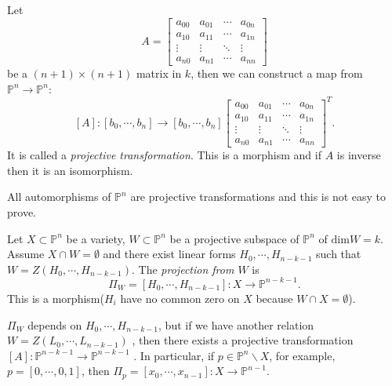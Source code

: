 \begin{definition}
	Let \begin{equation}
		A=\left[\begin{matrix}
				a_{00} & a_{01} & \cdots & a_{0n} \\
				a_{10} & a_{11} & \cdots & a_{1n} \\
				\vdots & \vdots & \ddots & \vdots \\
				a_{n0} & a_{n1} & \cdots & a_{nn}
			\end{matrix}\right]
	\end{equation}
	be a $ (n+1)\times (n+1) $ matrix  in $ k $, then we can construct a map from $ \mathbb{P}^n  \to  \mathbb{P}^n $:
	$$
		[A]:	[b_0,\cdots,b_n]\to [b_0,\cdots,b_n]\left[\begin{matrix}
				a_{00} & a_{01} & \cdots & a_{0n} \\
				a_{10} & a_{11} & \cdots & a_{1n} \\
				\vdots & \vdots & \ddots & \vdots \\
				a_{n0} & a_{n1} & \cdots & a_{nn}
			\end{matrix}\right]^{T}.
	$$
	It is called a \textit{projective transformation}. This is a morphism and if $ A $ is inverse then it is an isomorphism.
\end{definition}
\begin{remark}
	All automorphisms of $ \mathbb{P}^n $  are projective transformations and this is not easy to prove.
\end{remark}
\begin{definition}[Projection]
	Let $ X\subset\mathbb{P}^n  $ be a variety, $ W\subset \mathbb{P}^n $ be a projective subspace of $ \mathbb{P}^n $ of $ \mathrm{dim}W=k $. Assume $ X\cap W= \emptyset $ and there exist linear forms $ H_0,\cdots,H_{n-k-1} $ such that $ W=Z(H_0,\cdots,H_{n-k-1}) $. The \textit{projection from $ W $} is
	$$
		\Pi_W=[H_0,\cdots,H_{n-k-1}]:X\to \mathbb{P}^{n-k-1}.
	$$
	This is a morphism($ H_i $ have no common zero on $ X $ because $ W\cap X=\emptyset $).
\end{definition}
\begin{remark}
	$ \Pi_W $ depends on $ H_0,\cdots,H_{n-k-1} $, but if we have another relation $ W=Z(L_0,\cdots,L_{n-k-1}) $ , then there exists a projective transformation $ [A]:\mathbb{P}^{n-k-1}\to \mathbb{P}^{n-k-1} $ . In particular, if $ p\in \mathbb{P}^n\backslash X $, for example, $ p=[0,\cdots,0,1] $, then $ \Pi_p=[x_0,\cdots,x_{n-1}] :X\to \mathbb{P}^{n-1}$.
\end{remark}
